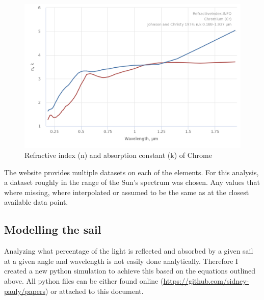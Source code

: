 \documentclass[14pt]{article}
\begin{document}
\begin{figure}[H]
  \centering
  \includegraphics[width=12cm]{./resources/RefractiveIndexChrome.png}
  \caption{Refractive index (n) and absorption constant (k) of Chrome}
  \label{fig:complex_refraction_chrome}
\end{figure}

The website provides multiple datasets on each of the elements. For this analysis,
a dataset roughly in the range of the Sun's spectrum was chosen. Any values that
where missing, where interpolated or assumed to be the same as at the closest
available data point.

\subsection{Modelling the sail}

Analyzing what percentage of the light is reflected and absorbed by a given sail at a given angle and wavelength
is not easily done analytically. Therefore I created a new python simulation to achieve this based on the equations outlined
above. All python files can be either found online (\url{https://github.com/sidney-pauly/papers}) or attached to this document.
\end{document}
